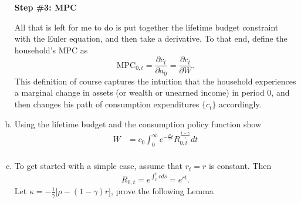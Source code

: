\documentclass[11pt]{extarticle}
\theoremstyle{plain}
\theoremstyle{definition}
\begin{document}
\begin{enumerate}[(a)]



\vspace{5mm}
\noindent
\textbf{Step \#3: MPC}



\vspace{3mm}
\noindent
All that is left for me to do is put together the lifetime budget constraint with the Euler equation, and then take a derivative. To that end, define the household's MPC as 
\begin{equation*}
	\text{MPC}_{0,t} = \frac{\partial c_t}{\partial a_0} = \frac{\partial c_t}{\partial W}.
\end{equation*}
This definition of course captures the intuition that the household experiences a marginal change in assets (or wealth or unearned income) in period $0$, and then changes his path of consumption expenditures $\{ c_t\}$ accordingly. 



\item Using the lifetime budget and the consumption policy function show
\begin{align*}
	W &= c_0 \int_0^\infty e^{- \frac{\rho}{\gamma} t} R_{0,t}^\frac{1-\gamma}{\gamma} dt \\
\end{align*}
\item To get started with a simple case, assume that $r_t = r$ is constant. Then 
\begin{equation*}
	R_{0,t} = e^{\int_0^t r ds } = e^{ r t}.
\end{equation*}
Let $\kappa =- \frac{1}{\gamma} \big[ \rho - (1-\gamma) r \big] $, prove the following Lemma


\end{enumerate}
\end{document}
